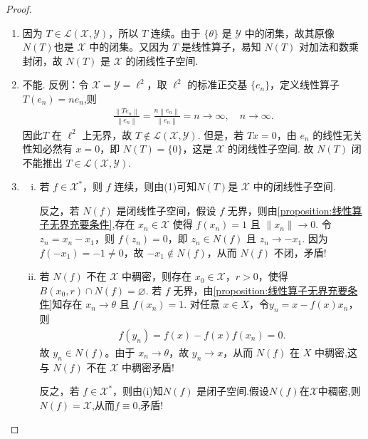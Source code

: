 \documentclass[../../main.tex]{subfiles}%
\begin{document}
\begin{proof}
\begin{enumerate}[(1)]
\item 因为 $T \in \mathscr{L}(\mathscr{X},\mathscr{Y})$，所以 $T$ 连续。由于 $\{\theta\}$ 是 $\mathscr{Y}$ 中的闭集，故其原像 $N(T)$也是 $\mathscr{X}$ 中的闭集。又因为 $T$ 是线性算子，易知 $N(T)$ 对加法和数乘封闭，故 $N(T)$ 是 $\mathscr{X}$ 的闭线性子空间.

\item 不能. 反例：令 $\mathscr{X} = \mathscr{Y} = \ell^2$，取 $\ell^2$ 的标准正交基 $\{e_n\}$，定义线性算子 $T(e_n) = n e_n$,则
\begin{align*}
\frac{\left\| Te_n \right\|}{\left\| e_n \right\|}=\frac{n\left\| e_n \right\|}{\left\| e_n \right\|}=n\rightarrow \infty ,\quad n\rightarrow \infty .
\end{align*}
因此$T$ 在 $\ell^2$ 上无界，故 $T \notin \mathscr{L}(\mathscr{X},\mathscr{Y})$. 但是，若 $Tx = 0$，由 $e_n$ 的线性无关性知必然有 $x = 0$，即 $N(T) = \{0\}$，这是 $\mathscr{X}$ 的闭线性子空间. 故 $N(T)$ 闭不能推出 $T \in \mathscr{L}(\mathscr{X},\mathscr{Y})$.

\item \begin{enumerate}[(i)]
\item 若 $f \in \mathscr{X}^*$，则 $f$ 连续，则由(1)可知$N(T)$是 $\mathscr{X}$ 中的闭线性子空间.

反之，若 $N(f)$ 是闭线性子空间，假设 $f$ 无界，则由\cref{proposition:线性算子无界充要条件},存在 $x_n \in \mathscr{X}$ 使得 $f(x_n) = 1$ 且 $\|x_n\| \to 0$. 令 $z_n = x_n - x_1$，则 $f(z_n) = 0$，即 $z_n \in N(f)$ 且 $z_n \to -x_1$. 因为 $f(-x_1) = -1 \neq 0$，故 $-x_1 \notin N(f)$，从而 $N(f)$ 不闭，矛盾! 

\item 若 $N(f)$ 不在 $\mathscr{X}$ 中稠密，则存在 $x_0 \in \mathscr{X}$，$r > 0$，使得 $B(x_0, r) \cap N(f) = \varnothing$. 
若 $f$ 无界，由\cref{proposition:线性算子无界充要条件}知存在 \(x_n \to \theta\) 且 \(f(x_n) = 1\). 对任意 \(x \in X\)，令\(y_n = x - f(x) x_n\)，则
\begin{align*}
f(y_n) = f(x) - f(x)f(x_n) = 0.
\end{align*}
故 \(y_n \in N(f)\)。由于 \(x_n \to \theta\)，故 \(y_n \to x\)，从而 \(N(f)\) 在 \(X\) 中稠密,这与 $N(f)$ 不在 $\mathscr{X}$ 中稠密矛盾!

反之，若 $f \in \mathscr{X}^*$，则由(i)知$N(f)$ 是闭子空间.假设$N(f)$在$\mathscr{X}$中稠密,则$N(f)=\mathscr{X}$,从而$f \equiv 0$,矛盾!
\end{enumerate}
\end{enumerate}
\end{proof}
\end{document}
